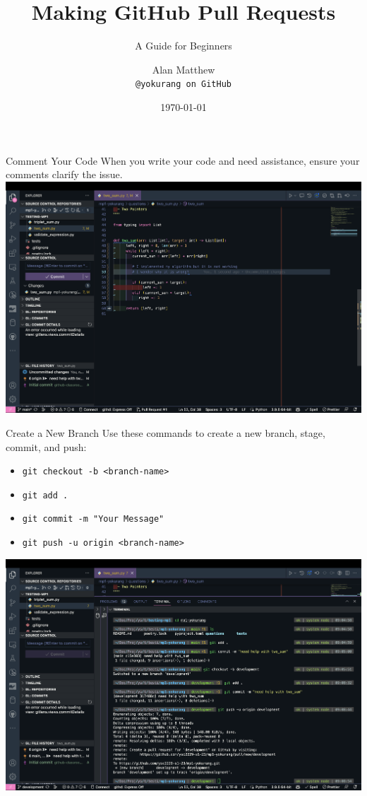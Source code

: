 \documentclass{beamer}
\title{Making GitHub Pull Requests}
\subtitle{A Guide for Beginners}
\author{Alan Matthew \\ {\small \texttt{@yokurang on GitHub}}}
\date{\today}
\begin{document}
\frame{\titlepage}

\begin{frame}{Comment Your Code}
    When you write your code and need assistance, ensure your comments clarify the issue.
    \includegraphics[width=\textwidth,height=0.6\textheight,keepaspectratio]{assets/write-some-code.png}
\end{frame}

\begin{frame}{Create a New Branch}
    Use these commands to create a new branch, stage, commit, and push:
    \begin{itemize}
        \item \texttt{git checkout -b <branch-name>}
        \item \texttt{git add .}
        \item \texttt{git commit -m "Your Message"}
        \item \texttt{git push -u origin <branch-name>}
    \end{itemize}
    \includegraphics[width=\textwidth,height=0.4\textheight,keepaspectratio]{assets/create-a-branch-and-push.png}
\end{frame}
\end{document}
